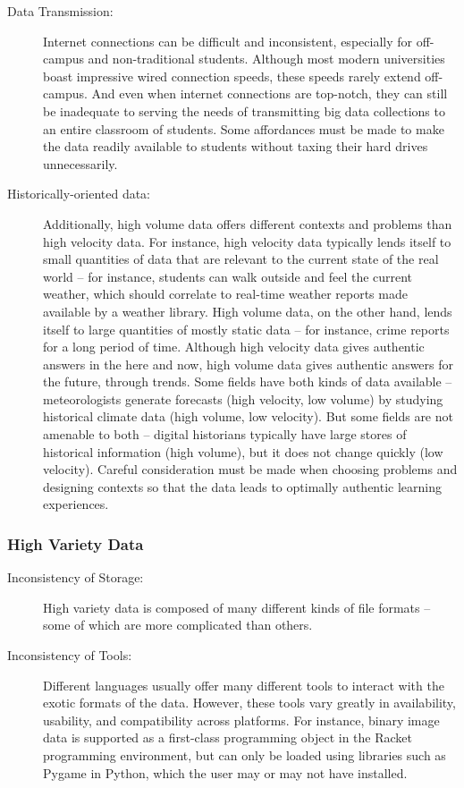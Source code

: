 \begin{description}
	\item[Data Transmission:] Internet connections can be difficult and inconsistent, especially for off-campus
and non-traditional students. Although most modern universities boast impressive wired connection
speeds, these speeds rarely extend off-campus. And even when internet connections are top-notch,
they can still be inadequate to serving the needs of transmitting big data collections to an entire
classroom of students. Some affordances must be made to make the data readily available to students without taxing their hard drives unnecessarily.
	\item[Historically-oriented data:] Additionally, high volume data offers different contexts and problems than high velocity data.
For instance, high velocity data typically lends itself to small quantities of data that are relevant to the current state of the real world -- for instance, students can walk outside and feel the current weather, which should correlate to real-time weather reports made available by a weather library.
High volume data, on the other hand, lends itself to large quantities of mostly static data -- for instance, crime reports for a long period of time.
Although high velocity data gives authentic answers in the here and now, high volume data gives authentic answers for the future, through trends.
Some fields have both kinds of data available -- meteorologists generate forecasts (high velocity, low volume) by studying historical climate data (high volume, low velocity).
But some fields are not amenable to both -- digital historians typically have large stores of historical information (high volume), but it does not change quickly (low velocity).
Careful consideration must be made when choosing problems and designing contexts so that the data leads to optimally authentic learning experiences.
\end{description}


\subsubsection{High Variety Data}

\begin{description}
\item[Inconsistency of Storage:] High variety data is composed of many different kinds of file formats -- some of which are more complicated than others.
\item[Inconsistency of Tools:] Different languages usually offer many different tools to interact with the exotic formats of the data. However, these tools vary greatly in availability, usability, and compatibility across platforms. For instance, binary image data is supported as a first-class programming object in the Racket programming environment, but can only be loaded using libraries such as Pygame in Python, which the user may or may not have installed.
\end{description}
